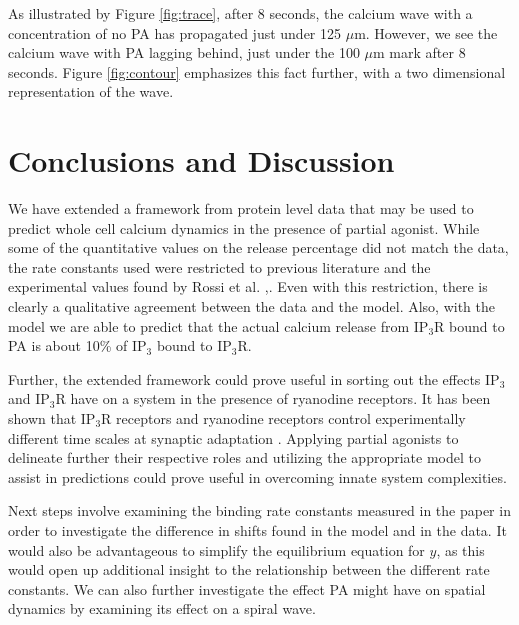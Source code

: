 \documentclass[preprint,12pt]{elsarticle}
\begin{document}


As illustrated by Figure \ref{fig:trace}, after 8 seconds, the calcium wave with a concentration of no PA has propagated just under 125 $\mu$m. However, we see the calcium wave with PA lagging behind, just under the 100 $\mu$m mark after 8 seconds. Figure \ref{fig:contour} emphasizes this fact further, with a two dimensional representation of the wave.

\section{Conclusions and Discussion}
We have extended a framework from protein level data that may be used to predict whole cell calcium dynamics in the presence of partial agonist. While some of the quantitative values on the release percentage did not match the data, the rate constants used were restricted to previous literature and the experimental values found by Rossi et al. \cite{young},\cite{rossi}. Even with this restriction, there is clearly a qualitative agreement between the data and the model. Also, with the model we are able to predict that the actual calcium release from IP$_3$R bound to PA is about 10\% of IP$_3$ bound to IP$_3$R. 

Further, the extended framework could prove useful in sorting out the effects IP$_3$ and IP$_3$R have on a system in the presence of ryanodine receptors. It has been shown that IP$_3$R receptors and ryanodine receptors control experimentally different time scales at synaptic adaptation \cite{ray}. Applying partial agonists to delineate further their respective roles and utilizing the appropriate model to assist in predictions could prove useful in overcoming innate system complexities.  

Next steps involve examining the binding rate constants measured in the paper in order to investigate the difference in shifts found in the model and in the data. It would also be advantageous to simplify the equilibrium equation for $y$, as this would open up additional insight to the relationship between the different rate constants. We can also further investigate the effect PA might have on spatial dynamics by examining its effect on a spiral wave. 
\end{document}
